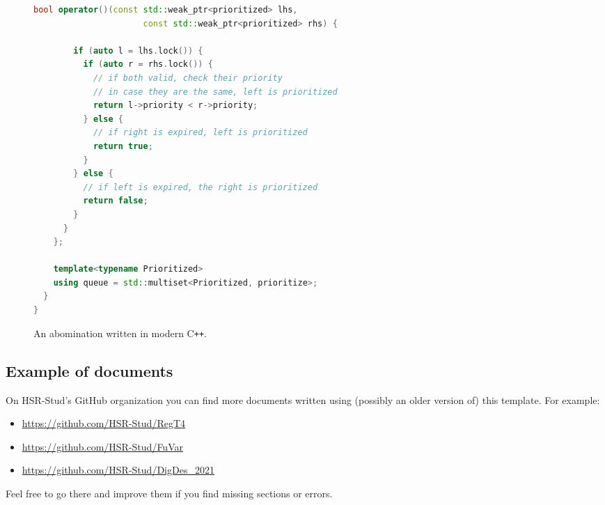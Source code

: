 \documentclass[margin=normal]{hsrzf}
\begin{document}
\begin{english}
\begin{figure*}
\begin{lstlisting}[language=c++]
      bool operator()(const std::weak_ptr<prioritized> lhs,
                      const std::weak_ptr<prioritized> rhs) {

        if (auto l = lhs.lock()) {
          if (auto r = rhs.lock()) {
            // if both valid, check their priority
            // in case they are the same, left is prioritized
            return l->priority < r->priority;
          } else {
            // if right is expired, left is prioritized
            return true;
          }
        } else {
          // if left is expired, the right is prioritized
          return false;
        }
      }
    };

    template<typename Prioritized>
    using queue = std::multiset<Prioritized, prioritize>;
  }
} 
    \end{lstlisting}
    \caption{
      An abomination written in modern C\texttt{++}.
      \label{fig:cpp-code}
    }
  \end{figure*}

  \subsection{Example of documents}

  On HSR-Stud's GitHub organization you can find more documents written using
  (possibly an older version of) this template. For example:
  \begin{itemize}
    \item \url{https://github.com/HSR-Stud/RegT4}
    \item \url{https://github.com/HSR-Stud/FuVar}
    \item \url{https://github.com/HSR-Stud/DigDes_2021}
  \end{itemize}
  Feel free to go there and improve them if you find missing sections or
  errors.

\end{english}

\end{document}
